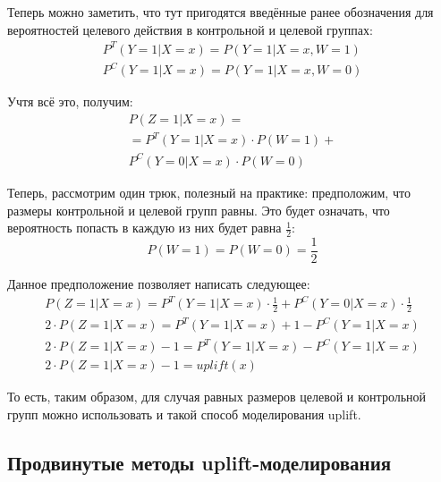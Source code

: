 Теперь можно заметить, что тут пригодятся введённые ранее обозначения для вероятностей целевого действия в контрольной и целевой группах:
\begin{gather*}
    P^T(Y = 1 | X = x) = P(Y = 1 | X = x, W = 1) \\
    P^C(Y = 1 | X = x) = P(Y = 1 | X = x, W = 0)
\end{gather*}

Учтя всё это, получим:
\begin{multline*}
    P(Z=1 | X = x) = \\
    = P^T(Y = 1 | X = x) \cdot P(W = 1) + \\
    P^C(Y = 0 | X = x) \cdot P(W = 0)
\end{multline*}

Теперь, рассмотрим один трюк, полезный на практике: предположим, что размеры контрольной и целевой групп равны. Это будет означать, что вероятность попасть в каждую из них будет равна $\frac{1}{2}$:
$$
    P(W = 1) = P(W = 0) = \frac{1}{2}
$$

Данное предположение позволяет написать следующее:
\begin{gather*}
    P(Z = 1 | X = x) =
        P^T(Y = 1 | X = x) \cdot \frac{1}{2} +
        P^C(Y = 0 | X = x) \cdot \frac{1}{2}
    \\
    2 \cdot P(Z = 1 | X = x) =
        P^T(Y = 1 | X = x) + 1 - P^C(Y = 1 | X = x)
    \\
    2 \cdot P(Z = 1 | X = x) - 1 =
        P^T(Y = 1 | X = x) - P^C(Y = 1 | X = x)
    \\
    2 \cdot P(Z = 1 | X = x) - 1 = uplift(x)
\end{gather*}

То есть, таким образом, для случая равных размеров целевой и контрольной групп можно использовать и такой способ моделирования uplift.























\subsection{Продвинутые методы uplift-моделирования}

